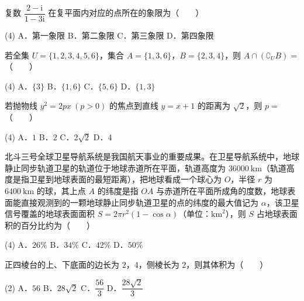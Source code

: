 \begin{question}
复数 $\dfrac{2-\mathrm i}{1-3\mathrm i}$ 在复平面内对应的点所在的象限为（　　）

\begin{gkopts}(4)
\task A．第一象限
\task B．第二象限
\task C．第三象限
\task D．第四象限
\end{gkopts}

\end{question}
\begin{question}
若全集 $U=\{1,2,3,4,5,6\}$，集合 $A=\{1,3,6\}$，$B=\{2,3,4\}$，则 $A\cap\left(\complement_U B\right)=$（　　）

\begin{gkopts}(4)
\task A．$\{3\}$
\task B．$\{1,6\}$
\task C．$\{5,6\}$
\task D．$\{1,3\}$
\end{gkopts}

\end{question}
\begin{question}
若抛物线 $y^{2}=2px\ (p>0)$ 的焦点到直线 $y=x+1$ 的距离为 $\sqrt2$，则 $p=$（　　）

\begin{gkopts}(4)
\task A．$1$
\task B．$2$
\task C．$2\sqrt2$
\task D．$4$
\end{gkopts}

\end{question}
\begin{question}
北斗三号全球卫星导航系统是我国航天事业的重要成果。在卫星导航系统中，地球静止同步轨道卫星的轨道位于地球赤道所在平面，轨道高度为 $36000\ \mathrm{km}$（轨道高度是指卫星到地球表面的最短距离），把地球看成一个球心为 $O$，半径 $r$ 为 $6400\ \mathrm{km}$ 的球，其上点 $A$ 的纬度是指 $OA$ 与赤道所在平面所成角的度数，地球表面能直接观测到的一颗地球静止同步轨道卫星的点的纬度的最大值记为 $\alpha$，该卫星信号覆盖的地球表面面积 $S=2\pi r^{2}(1-\cos\alpha)$（单位：$\mathrm{km}^{2}$），则 $S$ 占地球表面积的百分比约为（　　）

\begin{gkopts}(4)
\task A．$26\%$
\task B．$34\%$
\task C．$42\%$
\task D．$50\%$
\end{gkopts}

\end{question}
\begin{question}
正四棱台的上、下底面的边长为 $2$，$4$，侧棱长为 $2$，则其体积为（　　）

\begin{gkopts}(2)
\task A．$56$
\task B．$28\sqrt2$
\task C．$\dfrac{56}3$
\task D．$\dfrac{28\sqrt2}3$
\end{gkopts}

\end{question}
